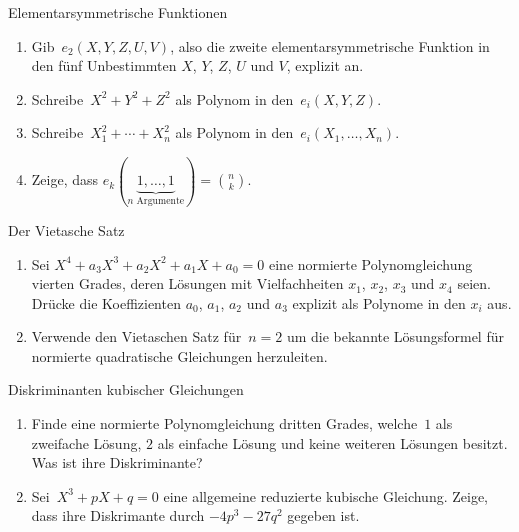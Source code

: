 \documentclass{algblatt}
\begin{document}
\vspace*{-1.5cm}

\begin{aufgabe}{Elementarsymmetrische Funktionen}
\begin{enumerate}
\item Gib~$e_2(X,Y,Z,U,V)$, also
die zweite elementarsymmetrische Funktion in den fünf Unbestimmten
$X$, $Y$, $Z$, $U$ und $V$, explizit an.
\item Schreibe~$X^2 + Y^2 + Z^2$ als Polynom in den~$e_i(X,Y,Z)$.
\item Schreibe~$X_1^2 + \cdots + X_n^2$ als Polynom in
den~$e_i(X_1,\ldots,X_n)$.
\item Zeige, dass $e_k(\underbrace{1, \dots, 1}_{\text{$n$ Argumente}}) = \binom{n}{k}$.
\end{enumerate}
\end{aufgabe}

\begin{aufgabe}{Der Vietasche Satz}
\begin{enumerate}
\item Sei $X^4 + a_3 X^3 + a_2 X^2 + a_1 X + a_0 = 0$ eine normierte Polynomgleichung
vierten Grades, deren Lösungen mit Vielfachheiten $x_1$, $x_2$, $x_3$
und $x_4$ seien. Drücke die Koeffizienten $a_0$, $a_1$, $a_2$ und
$a_3$ explizit als Polynome in den $x_i$ aus.
\item Verwende den Vietaschen Satz für~$n = 2$ um die bekannte Lösungsformel
für normierte quadratische Gleichungen herzuleiten.
\end{enumerate}
\end{aufgabe}

\begin{aufgabe}{Diskriminanten kubischer Gleichungen}
\begin{enumerate}
\item Finde eine normierte Polynomgleichung dritten Grades, welche~$1$
als zweifache Lösung, $2$ als einfache Lösung und keine weiteren Lösungen
besitzt. Was ist ihre Diskriminante?
\item Sei~$X^3 + p X + q = 0$ eine allgemeine reduzierte kubische Gleichung.
Zeige, dass ihre Diskrimante durch $-4 p^3 - 27 q^2$ gegeben ist.
\end{enumerate}
\end{aufgabe}
\end{document}
